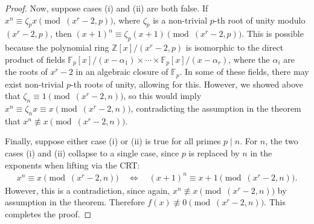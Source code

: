 \documentclass{article}
\theoremstyle{plain}
\theoremstyle{definition}
\newcommand{\Z}{\mathbb{Z}}
\begin{document}
\begin{proof}
Now, suppose cases (i) and (ii) are both false. If $x^n \equiv \zeta_p x \pmod{(x^r-2, p)}$, where $\zeta_p$ is a non-trivial $p$-th root of unity modulo $(x^r-2, p)$, then $(x+1)^n \equiv \zeta_p (x+1) \pmod{(x^r-2, p)}$. This is possible because the polynomial ring $\Z[x]/(x^r-2, p)$ is isomorphic to the direct product of fields $\mathbb{F}_p[x]/(x-\alpha_1) \times \cdots \times \mathbb{F}_p[x]/(x-\alpha_r)$, where the $\alpha_i$ are the roots of $x^r-2$ in an algebraic closure of $\mathbb{F}_p$. In some of these fields, there may exist non-trivial $p$-th roots of unity, allowing for this. However, we showed above that $\zeta_n \equiv 1 \pmod{(x^r-2, n)}$, so this would imply $x^n \equiv \zeta_n x \equiv x \pmod{(x^r-2, n)}$, contradicting the assumption in the theorem that $x^n \not\equiv x \pmod{(x^r-2, n)}$.

Finally, suppose either case (i) or (ii) is true for all primes $p \mid n$. For $n$, the two cases (i) and (ii) collapse to a single case, since $p$ is replaced by $n$ in the exponents when lifting via the CRT:
\begin{align*}
x^n \equiv x \pmod{(x^r-2, n)} \quad\Longleftrightarrow\quad (x+1)^n \equiv x+1 \pmod{(x^r-2, n)} .
\end{align*}
However, this is a contradiction, since again, $x^n \not\equiv x \pmod{(x^r-2, n)}$ by assumption in the theorem. Therefore $f(x) \not\equiv 0 \pmod{(x^r-2, n)}$. This completes the proof.
\end{proof}
\end{document}
